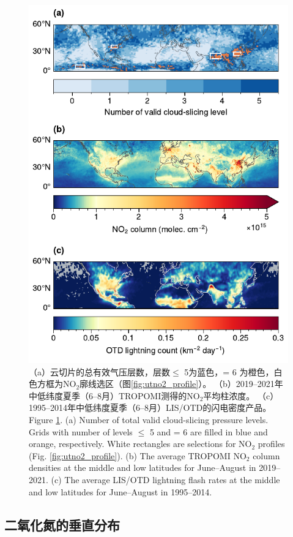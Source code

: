 \begin{figure}[!htbp]
    \centering
    \includegraphics[width=12cm]{./figures/no2_ltngcount.pdf}
    \caption{
    （a）云切片的总有效气压层数，层数$\leq$ 5为蓝色，= 6 为橙色，白色方框为NO$_2$廓线选区（图\ref{fig:utno2_profile}）。
    （b）2019--2021年中低纬度夏季（6--8月）TROPOMI测得的NO$_2$平均柱浓度。
    （c）1995--2014年中低纬度夏季（6--8月）LIS/OTD的闪电密度产品。 \\
    Figure \ref{fig:no2_ltngcount}. (a) Number of total valid cloud-slicing pressure levels.
    Grids with number of levels $\leq$ 5 and = 6 are filled in blue and orange, respectively.
    White rectangles are selections for NO$_2$ profiles (Fig. \ref{fig:utno2_profile}).
    (b) The average TROPOMI NO$_2$ column densities at the middle and low latitudes for June--August in 2019--2021.
    (c) The average LIS/OTD lightning flash rates at the middle and low latitudes for June--August in 1995--2014.
    }
    \label{fig:no2_ltngcount}
\end{figure}

\subsection{二氧化氮的垂直分布} \label{sec:no2_profile}


